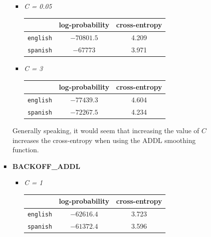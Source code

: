 \documentclass[11pt]{article}
\begin{document}
\begin{enumerate}
\begin{enumerate}[label=(\alph*)]
\begin{itemize}
\begin{itemize}
\begin{center}
\begin{tabular}{| r || c | c |}
				\end{tabular}\end{center}
				
			\item[] \hspace{-24pt} \textit{C = 0.05} \vspace{4pt}
				\begin{center}\begin{tabular}{| r || c | c |}
				\hline
									& log-probability	& cross-entropy \\
				\hline \hline
				\texttt{english}	& $-70801.5$		& 4.209			\\
				\texttt{spanish}	& $-67773$			& 3.971			\\
				\hline
				
				\end{tabular}\end{center}

			\item[] \hspace{-24pt} \textit{C = 3} 	 \vspace{4pt}
				\begin{center}\begin{tabular}{| r || c | c |}
				\hline
									& log-probability	& cross-entropy \\
				\hline \hline
				\texttt{english}	& $-77439.3$		& 4.604			\\
				\texttt{spanish}	& $-72267.5$		& 4.234			\\
				\hline
				
				\end{tabular}\end{center}

			\end{itemize} \vspace{8pt}

			Generally speaking, it would seem that increasing the value of $C$ increases the cross-entropy when using the ADDL smoothing function. 
			\vspace{8pt} \\

		\item[] \hspace{-24pt} \textbf{BACKOFF\_ADDL}
			\begin{itemize}
			\item[] \hspace{-24pt} \textit{C = 1} 	 \vspace{4pt}
				\begin{center}\begin{tabular}{| r || c | c |}
				\hline
									& log-probability	& cross-entropy \\
				\hline \hline
				\texttt{english}	& $-62616.4$		& 3.723			\\
				\texttt{spanish}	& $-61372.4$		& 3.596			\\
				\hline
				

\end{tabular}
\end{center}
\end{itemize}
\end{itemize}
\end{enumerate}
\end{enumerate}
\end{document}
